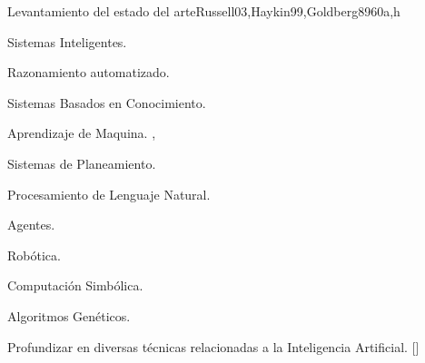 \begin{syllabus}
\begin{unit}{}{Levantamiento del estado del arte}{Russell03,Haykin99,Goldberg89}{60}{a,h}
\begin{topics}
  \item Sistemas Inteligentes.
  \item Razonamiento automatizado.
  \item Sistemas Basados en Conocimiento.
  \item Aprendizaje de Maquina. \cite{Russell03},\cite{Haykin99}
  \item Sistemas de Planeamiento.
  \item Procesamiento de Lenguaje Natural.
  \item Agentes.
  \item Robótica.
  \item Computación Simbólica.
  \item Algoritmos Genéticos. \cite{Goldberg89}
\end{topics}
\begin{learningoutcomes}
  \item Profundizar en diversas técnicas relacionadas a la Inteligencia Artificial. [\Usage]
\end{learningoutcomes}
\end{unit}

\begin{coursebibliography}
\end{coursebibliography}

\end{syllabus}

